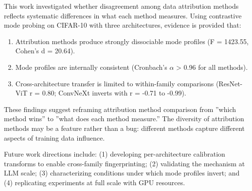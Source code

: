 
This work investigated whether disagreement among data attribution methods reflects systematic differences in what each method measures. Using contrastive mode probing on CIFAR-10 with three architectures, evidence is provided that:

\begin{enumerate}
\item Attribution methods produce strongly dissociable mode profiles (F = 1423.55, Cohen's d = 20.64).
\item Mode profiles are internally consistent (Cronbach's $\alpha$ > 0.96 for all methods).
\item Cross-architecture transfer is limited to within-family comparisons (ResNet-ViT r = 0.80; ConvNeXt inverts with r = -0.71 to -0.99).
\end{enumerate}

These findings suggest reframing attribution method comparison from ''which method wins'' to ''what does each method measure.'' The diversity of attribution methods may be a feature rather than a bug: different methods capture different aspects of training data influence.

Future work directions include: (1) developing per-architecture calibration transforms to enable cross-family fingerprinting; (2) validating the mechanism at LLM scale; (3) characterizing conditions under which mode profiles invert; and (4) replicating experiments at full scale with GPU resources.
